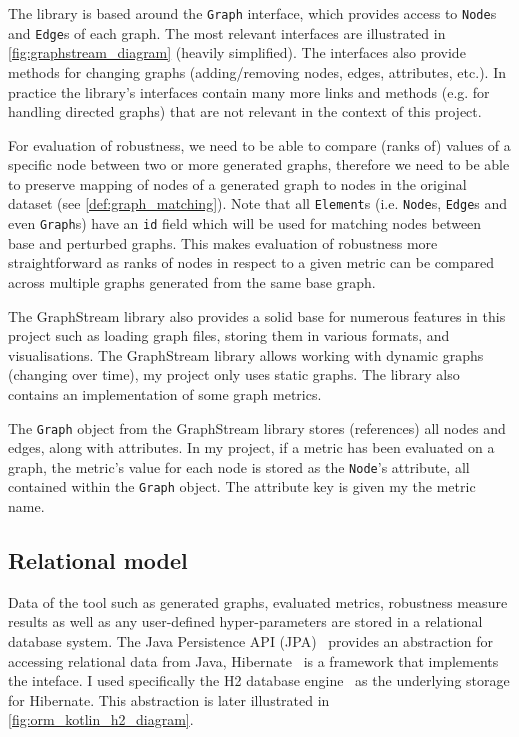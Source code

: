 

The library is based around the \texttt{Graph} interface, which provides access to \texttt{Node}s and \texttt{Edge}s of each graph.
The most relevant interfaces are illustrated in \autoref{fig:graphstream_diagram} (heavily simplified).
The interfaces also provide methods for changing graphs (adding/removing nodes, edges, attributes, etc.).
In practice the library's interfaces contain many more links and methods (e.g. for handling directed graphs) that are not relevant in the context of this project.

For evaluation of robustness, we need to be able to compare (ranks of) values of a specific node between two or more generated graphs, therefore we need to be able to preserve mapping of nodes of a generated graph to nodes in the original dataset (see \autoref{def:graph_matching}).
Note that all \texttt{Element}s (i.e. \texttt{Node}s, \texttt{Edge}s and even \texttt{Graph}s) have an \texttt{id} field which will be used for matching nodes between base and perturbed graphs.
This makes evaluation of robustness more straightforward as ranks of nodes in respect to a given metric can be compared across multiple graphs generated from the same base graph.

The GraphStream library also provides a solid base for numerous features in this project such as loading graph files, storing them in various formats, and visualisations.
The GraphStream library allows working with dynamic graphs (changing over time), my project only uses static graphs.
The library also contains an implementation of some graph metrics.

\parspace

The \texttt{Graph} object from the GraphStream library stores (references) all nodes and edges, along with attributes.
In my project, if a metric has been evaluated on a graph, the metric's value for each node is stored as the \texttt{Node}'s attribute, all contained within the \texttt{Graph} object.
The attribute key is given my the metric name.

\subsection{Relational model}

Data of the \graffs tool such as generated graphs, evaluated metrics, robustness measure results as well as any user-defined hyper-parameters are stored in a relational database system.
The Java Persistence API (JPA)~\cite{BiswasJavaPersistenceAPI2016} provides an abstraction for accessing relational data from Java, Hibernate~\cite{ElliottHibernateDeveloperNotebook2004,BauerJavaPersistenceHibernate2015} is a framework that implements the inteface.
I used specifically the H2 database engine~\cite{MuellerH2DatabaseEngine2006} as the underlying storage for Hibernate.
This abstraction is later illustrated in \autoref{fig:orm_kotlin_h2_diagram}.

